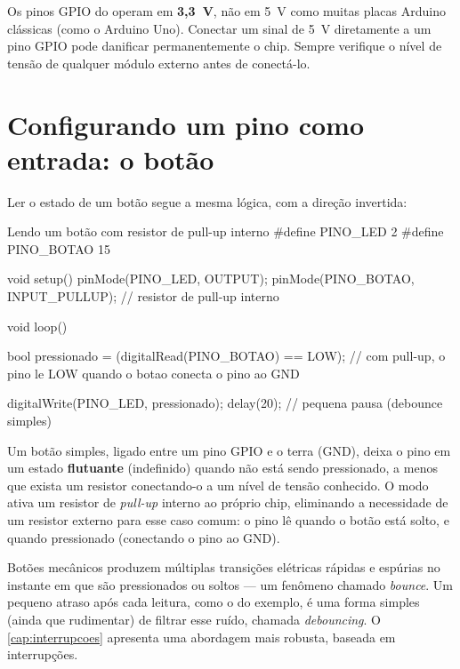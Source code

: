 \begin{atencao}
Os pinos GPIO do \ESP{} operam em \textbf{3,3~V}, não em 5~V como muitas placas Arduino clássicas (como o Arduino Uno). Conectar um sinal de 5~V diretamente a um pino GPIO pode danificar permanentemente o chip. Sempre verifique o nível de tensão de qualquer módulo externo antes de conectá-lo.
\end{atencao}

\section{Configurando um pino como entrada: o botão}

Ler o estado de um botão segue a mesma lógica, com a direção invertida:

\begin{codigoc}{Lendo um botão com resistor de pull-up interno}
#define PINO_LED    2
#define PINO_BOTAO  15

void setup() {
    pinMode(PINO_LED, OUTPUT);
    pinMode(PINO_BOTAO, INPUT_PULLUP);   // resistor de pull-up interno
}

void loop() {
    bool pressionado = (digitalRead(PINO_BOTAO) == LOW);
    // com pull-up, o pino le LOW quando o botao conecta o pino ao GND

    digitalWrite(PINO_LED, pressionado);
    delay(20);   // pequena pausa (debounce simples)
}
\end{codigoc}

\begin{nota}
Um botão simples, ligado entre um pino GPIO e o terra (GND), deixa o pino em um estado \textbf{flutuante} (indefinido) quando não está sendo pressionado, a menos que exista um resistor conectando-o a um nível de tensão conhecido. O modo  ativa um resistor de \emph{pull-up} interno ao próprio chip, eliminando a necessidade de um resistor externo para esse caso comum: o pino lê  quando o botão está solto, e  quando pressionado (conectando o pino ao GND).
\end{nota}

\begin{dica}
Botões mecânicos produzem múltiplas transições elétricas rápidas e espúrias no instante em que são pressionados ou soltos — um fenômeno chamado \emph{bounce}. Um pequeno atraso após cada leitura, como o  do exemplo, é uma forma simples (ainda que rudimentar) de filtrar esse ruído, chamada \emph{debouncing}. O \cref{cap:interrupcoes} apresenta uma abordagem mais robusta, baseada em interrupções.
\end{dica}

